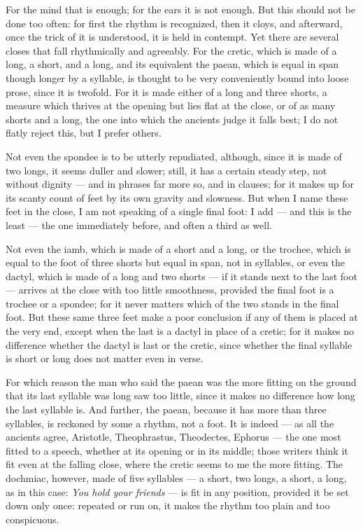  For the mind that is enough; for the ears it is not enough. But this should not be done too often: for first the rhythm is recognized, then it cloys, and afterward, once the trick of it is understood, it is held in contempt. Yet there are several closes that fall rhythmically and agreeably. For the cretic, which is made of a long, a short, and a long, and its equivalent the paean, which is equal in span though longer by a syllable, is thought to be very conveniently bound into loose prose, since it is twofold. For it is made either of a long and three shorts, a measure which thrives at the opening but lies flat at the close, or of as many shorts and a long, the one into which the ancients judge it falls best; I do not flatly reject this, but I prefer others.

 Not even the spondee is to be utterly repudiated, although, since it is made of two longs, it seems duller and slower; still, it has a certain steady step, not without dignity — and in phrases far more so, and in clauses; for it makes up for its scanty count of feet by its own gravity and slowness. But when I name these feet in the close, I am not speaking of a single final foot: I add — and this is the least — the one immediately before, and often a third as well.

 Not even the iamb, which is made of a short and a long, or the trochee, which is equal to the foot of three shorts but equal in span, not in syllables, or even the dactyl, which is made of a long and two shorts — if it stands next to the last foot — arrives at the close with too little smoothness, provided the final foot is a trochee or a spondee; for it never matters which of the two stands in the final foot. But these same three feet make a poor conclusion if any of them is placed at the very end, except when the last is a dactyl in place of a cretic; for it makes no difference whether the dactyl is last or the cretic, since whether the final syllable is short or long does not matter even in verse.

 For which reason the man who said the paean was the more fitting on the ground that its last syllable was long saw too little, since it makes no difference how long the last syllable is. And further, the paean, because it has more than three syllables, is reckoned by some a rhythm, not a foot. It is indeed — as all the ancients agree, Aristotle, Theophrastus, Theodectes, Ephorus — the one most fitted to a speech, whether at its opening or in its middle; those writers think it fit even at the falling close, where the cretic seems to me the more fitting. The dochmiac, however, made of five syllables — a short, two longs, a short, a long, as in this case: \textit{You hold your friends} — is fit in any position, provided it be set down only once: repeated or run on, it makes the rhythm too plain and too conspicuous.

